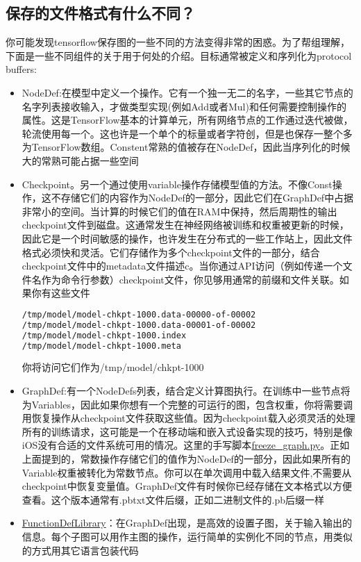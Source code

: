 \subsection{保存的文件格式有什么不同？}
你可能发现tensorflow保存图的一些不同的方法变得非常的困惑。为了帮组理解，下面是一些不同组件的关于用于何处的介绍。目标通常被定义和序列化为protocol buffers:
\begin{itemize}
\item NodeDef:在模型中定义一个操作。它有一个独一无二的名字，一些其它节点的名字列表接收输入，才做类型实现(例如Add或者Mul)和任何需要控制操作的属性。这是TensorFlow基本的计算单元，所有网络节点的工作通过迭代被做，轮流使用每一个。这也许是一个单个的标量或者字符创，但是也保存一整个多为TensorFlow数组。Constent常熟的值被存在NodeDef，因此当序列化的时候大的常熟可能占据一些空间
\item Checkpoint。另一个通过使用variable操作存储模型值的方法。不像Const操作，这不存储它们的内容作为NodeDef的一部分，因此它们在GraphDef中占据非常小的空间。当计算的时候它们的值在RAM中保持，然后周期性的输出checkpoint文件到磁盘。这通常发生在神经网络被训练和权重被更新的时候，因此它是一个时间敏感的操作，也许发生在分布式的一些工作站上，因此文件格式必须快和灵活。它们存储作为多个checkpoint文件的一部分，结合checkpoint文件中的metadata文件描述c。当你通过API访问（例如传递一个文件名作为命令行参数）checkpoint文件，你见够用通常的前缀和文件关联。如果你有这些文件
\begin{lstlisting}[language=Bash]
/tmp/model/model-chkpt-1000.data-00000-of-00002
/tmp/model/model-chkpt-1000.data-00001-of-00002
/tmp/model/model-chkpt-1000.index
/tmp/model/model-chkpt-1000.meta
\end{lstlisting}
你将访问它们作为/tmp/model/chkpt-1000
\item GraphDef:有一个NodeDefs列表，结合定义计算图执行。在训练中一些节点将为Variables，因此如果你想有一个完整的可运行的图，包含权重，你将需要调用恢复操作从checkpoint文件获取这些值。因为checkpoint载入必须灵活的处理所有的训练请求，这可能是一个在移动端和嵌入式设备实现的技巧，特别是像iOS没有合适的文件系统可用的情况。这里的手写脚本\href{https://www.github.com/tensorflow/tensorflow/blob/r1.4/tensorflow/python/tools/freeze_graph.py}{freeze\_graph.py}。正如上面提到的，常数操作存储它们的值作为NodeDef的一部分，因此如果所有的Variable权重被转化为常数节点。你可以在单次调用中载入结果文件,不需要从checkpoint中恢复变量值。GraphDef文件有时候你已经存储在文本格式以方便查看。这个版本通常有.pbtxt文件后缀，正如二进制文件的.pb后缀一样
\item \href{https://www.github.com/tensorflow/tensorflow/blob/r1.4/tensorflow/core/framework/function.proto}{FunctionDefLibrary}：在GraphDef出现，是高效的设置子图，关于输入输出的信息。每个子图可以用作主图的操作，运行简单的实例化不同的节点，用类似的方式用其它语言包装代码

\end{itemize}
